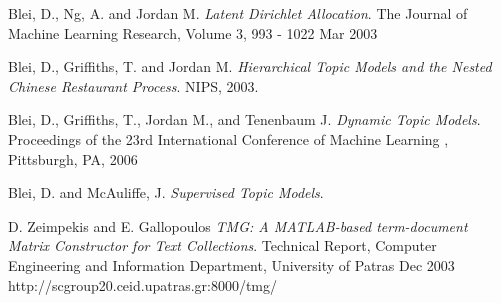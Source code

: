 \documentclass[DIV=calc, paper=letter, fontsize=10pt, twocolumn]{scrartcl}	 %
\begin{document}
\begin{thebibliography}{99}

  Blei, D., Ng, A. and Jordan M.
  \emph{Latent Dirichlet Allocation}.
  The Journal of Machine Learning Research,
 Volume 3, 993 - 1022
 Mar 2003
 
  Blei, D., Griffiths, T. and Jordan M.
  \emph{Hierarchical Topic Models and the Nested Chinese Restaurant Process}.
  NIPS,
 2003.
 
  Blei, D., Griffiths, T., Jordan M., and Tenenbaum J. 
  \emph{Dynamic Topic Models}.
  Proceedings of the 23rd International Conference of Machine Learning ,
 Pittsburgh, PA,
 2006
 
  Blei, D. and McAuliffe, J.
  \emph{Supervised Topic Models}.
 
  D. Zeimpekis and E. Gallopoulos
  \emph{TMG: A MATLAB-based term-document Matrix Constructor for Text Collections}.
  Technical Report, Computer Engineering and Information Department, University of Patras
  Dec 2003
  http://scgroup20.ceid.upatras.gr:8000/tmg/

\end{thebibliography}
\end{document}
